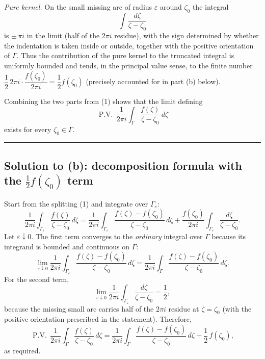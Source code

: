 \documentclass[11pt]{article}
\begin{document}
	\emph{Pure kernel.}
	On the small missing arc of radius $\varepsilon$ around $\zeta_{0}$ the integral
	\[
	\int\frac{d\zeta}{\zeta-\zeta_{0}}
	\]
	is $\pm\,\pi i$ in the limit (half of the $2\pi i$ residue), with the sign determined by whether the indentation is taken inside or outside, together with the positive orientation of $\Gamma$.
	Thus the contribution of the pure kernel to the truncated integral is uniformly bounded and tends, in the principal value sense, to the finite number $\dfrac{1}{2}\,2\pi i\cdot \dfrac{f(\zeta_{0})}{2\pi i}=\dfrac{1}{2}f(\zeta_{0})$ (precisely accounted for in part (b) below).
	
	\medskip
	
	Combining the two parts from (1) shows that the limit defining
	\[
	\operatorname{P.V.}\,\frac{1}{2\pi i}\int_{\Gamma}\frac{f(\zeta)}{\zeta-\zeta_{0}}\,d\zeta
	\]
	exists for every $\zeta_{0}\in\Gamma$.
	
	\bigskip\hrule\bigskip
	
	\subsection*{Solution to (b): decomposition formula with the $\tfrac12 f(\zeta_{0})$ term}
	
	Start from the splitting \textnormal{(1)} and integrate over $\Gamma_{\varepsilon}$:
	\[
	\frac{1}{2\pi i}\int_{\Gamma_{\varepsilon}}\frac{f(\zeta)}{\zeta-\zeta_{0}}\,d\zeta
	=
	\frac{1}{2\pi i}\int_{\Gamma_{\varepsilon}}\frac{f(\zeta)-f(\zeta_{0})}{\zeta-\zeta_{0}}\,d\zeta
	+\frac{f(\zeta_{0})}{2\pi i}\int_{\Gamma_{\varepsilon}}\frac{d\zeta}{\zeta-\zeta_{0}}.
	\]
	Let $\varepsilon\downarrow 0$.
	The first term converges to the \emph{ordinary} integral over $\Gamma$ because its integrand is bounded and continuous on $\Gamma$:
	\[
	\lim_{\varepsilon\downarrow 0}\frac{1}{2\pi i}\int_{\Gamma_{\varepsilon}}\frac{f(\zeta)-f(\zeta_{0})}{\zeta-\zeta_{0}}\,d\zeta
	=
	\frac{1}{2\pi i}\int_{\Gamma}\frac{f(\zeta)-f(\zeta_{0})}{\zeta-\zeta_{0}}\,d\zeta.
	\]
	For the second term,
	\[
	\lim_{\varepsilon\downarrow 0}\frac{1}{2\pi i}\int_{\Gamma_{\varepsilon}}\frac{d\zeta}{\zeta-\zeta_{0}}
	=\frac{1}{2},
	\]
	because the missing small arc carries half of the $2\pi i$ residue at $\zeta=\zeta_{0}$ (with the positive orientation prescribed in the statement).
	Therefore,
	\[
	\operatorname{P.V.}\,\frac{1}{2\pi i}\int_{\Gamma}\frac{f(\zeta)}{\zeta-\zeta_{0}}\,d\zeta
	=
	\frac{1}{2\pi i}\int_{\Gamma}\frac{f(\zeta)-f(\zeta_{0})}{\zeta-\zeta_{0}}\,d\zeta
	+\frac{1}{2}\,f(\zeta_{0}),
	\]
	as required.
	
\end{document}
